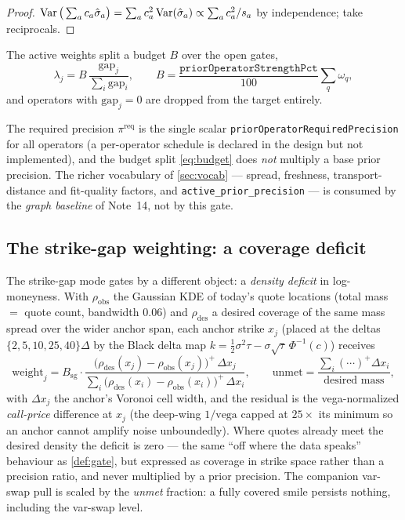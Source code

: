 \documentclass[11pt]{article}
\begin{document}
\begin{proof}
$\operatorname{Var}\big(\sum_ac_a\hat\sigma_a\big)=\sum_ac_a^2\operatorname{Var}(\hat\sigma_a)
\propto\sum_ac_a^2/s_a$ by independence; take reciprocals.
\end{proof}

The active weights split a budget $B$ over the open gates,
\begin{equation}
\lambda_j=B\,\frac{\mathrm{gap}_j}{\sum_i \mathrm{gap}_i},
\qquad B=\frac{\texttt{priorOperatorStrengthPct}}{100}\sum_q\omega_q ,
\label{eq:budget}
\end{equation}
and operators with $\mathrm{gap}_j=0$ are dropped from the target entirely.

\begin{remark}
\label{rem:notused}
The required precision $\pi^{\text{req}}$ is the single scalar
\texttt{priorOperatorRequiredPrecision} for all operators (a per-operator
schedule is declared in the design but not implemented), and the budget split
\eqref{eq:budget} does \emph{not} multiply a base prior precision. The richer
vocabulary of \cref{sec:vocab} --- spread, freshness, transport-distance and
fit-quality factors, and \texttt{active\_prior\_precision} --- is consumed by
the \emph{graph baseline} of Note~14, not by this gate.
\end{remark}

\subsection{The strike-gap weighting: a coverage deficit}
\label{sec:sggate}

The strike-gap mode gates by a different object: a \emph{density deficit} in
log-moneyness. With $\rho_{\text{obs}}$ the Gaussian KDE of today's quote
locations (total mass $=$ quote count, bandwidth $0.06$) and
$\rho_{\text{des}}$ a desired coverage of the same mass spread over the wider
anchor span, each anchor strike $x_j$ (placed at the deltas
$\{2,5,10,25,40\}\Delta$ by the Black delta map
$k=\tfrac12\sigma^2\tau-\sigma\sqrt\tau\,\Phi^{-1}(c)$) receives
\begin{equation}
\text{weight}_j
=B_{\text{sg}}\cdot
\frac{\big(\rho_{\text{des}}(x_j)-\rho_{\text{obs}}(x_j)\big)^{+}\,\Delta x_j}
{\sum_i\big(\rho_{\text{des}}(x_i)-\rho_{\text{obs}}(x_i)\big)^{+}\,\Delta x_i},
\qquad
\text{unmet}=\frac{\sum_i(\cdots)^+\Delta x_i}{\text{desired mass}},
\label{eq:deficit}
\end{equation}
with $\Delta x_j$ the anchor's Voronoi cell width, and the residual is the
vega-normalized \emph{call-price} difference at $x_j$ (the deep-wing
$1/\text{vega}$ capped at $25\times$ its minimum so an anchor cannot amplify
noise unboundedly). Where quotes already meet the desired density the deficit
is zero --- the same ``off where the data speaks'' behaviour as
\cref{def:gate}, but expressed as coverage in strike space rather than a
precision ratio, and never multiplied by a prior precision. The companion
var-swap pull is scaled by the \emph{unmet} fraction: a fully covered smile
persists nothing, including the var-swap level.
\end{document}
